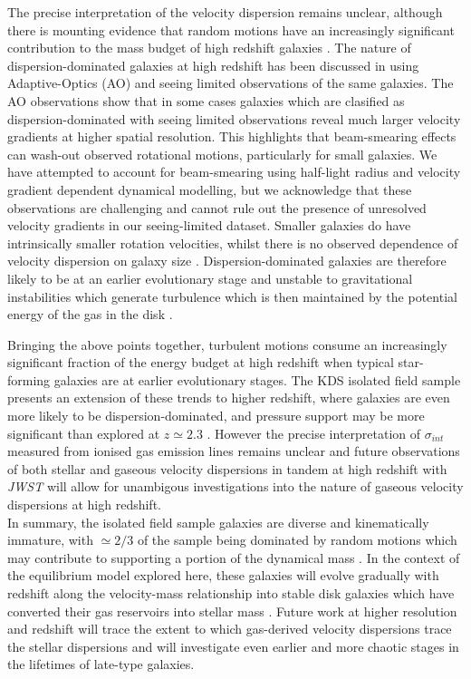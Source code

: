 \documentclass[fleqn,usenatbib]{mnras}
\begin{document}
The precise interpretation of the velocity dispersion remains unclear, although there is mounting evidence that random motions have an increasingly significant contribution to the mass budget of high redshift galaxies \citep[e.g.][]{Kassin2007,Law2009,Burkert2010,Kassin2012,Wuyts2016b,Lang2017,Ubler2017,Genzel2017}.
The nature of dispersion-dominated galaxies at high redshift has been discussed in \cite{Newman2013} using Adaptive-Optics (AO) and seeing limited observations of the same galaxies.
The AO observations show that in some cases galaxies which are clasified as dispersion-dominated with seeing limited observations reveal much larger velocity gradients at higher spatial resolution.
This highlights that beam-smearing effects can wash-out observed rotational motions, particularly for small galaxies.
We have attempted to account for beam-smearing using half-light radius and velocity gradient dependent dynamical modelling, but we acknowledge that these observations are challenging and cannot rule out the presence of unresolved velocity gradients in our seeing-limited dataset.
Smaller galaxies do have intrinsically smaller rotation velocities, whilst there is no observed dependence of velocity dispersion on galaxy size \citep[e.g.][]{Newman2013}.
Dispersion-dominated galaxies are therefore likely to be at an earlier evolutionary stage and unstable to gravitational instabilities which generate turbulence which is then maintained by the potential energy of the gas in the disk \citep{Burkert2010,Newman2013}.

Bringing the above points together, turbulent motions consume an increasingly significant fraction of the energy budget at high redshift when typical star-forming galaxies are at earlier evolutionary stages.
The KDS isolated field sample presents an extension of these trends to higher redshift, where galaxies are even more likely to be dispersion-dominated, and pressure support may be more significant than explored at $z\simeq2.3$ \citep{Wuyts2016b,Ubler2017,Genzel2017,Lang2017}.    
However the precise interpretation of $\sigma_{int}$ measured from ionised gas emission lines remains unclear and future observations of both stellar and gaseous velocity dispersions in tandem at high redshift with {\it JWST} will allow for unambigous investigations into the nature of gaseous velocity dispersions at high redshift. \\

In summary, the isolated field sample galaxies are diverse and kinematically immature, with $\simeq2/3$ of the sample being dominated by random motions which may contribute to supporting a portion of the dynamical mass \citep[e.g.][]{Kassin2007,Burkert2010,Kassin2012,Newman2013,Straatman2017,Ubler2017,Lang2017}.
In the context of the equilibrium model explored here, these galaxies will evolve gradually with redshift along the velocity-mass relationship into stable disk galaxies which have converted their gas reservoirs into stellar mass \citep[e.g.][]{Lilly2013,Tacconi2013,Wisnioski2015,Tacconi2017}. 
Future work at higher resolution and redshift will trace the extent to which gas-derived velocity dispersions trace the stellar dispersions and will investigate even earlier and more chaotic stages in the lifetimes of late-type galaxies.
\end{document}
